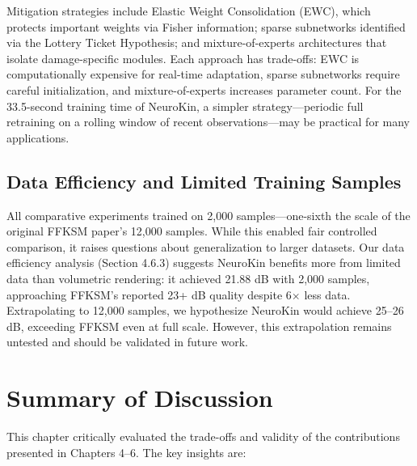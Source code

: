﻿\documentclass[12pt,a4paper,oneside]{report}
\begin{document}
Mitigation strategies include Elastic Weight Consolidation (EWC), which protects important weights via Fisher information; sparse subnetworks identified via the Lottery Ticket Hypothesis; and mixture-of-experts architectures that isolate damage-specific modules. Each approach has trade-offs: EWC is computationally expensive for real-time adaptation, sparse subnetworks require careful initialization, and mixture-of-experts increases parameter count. For the 33.5-second training time of NeuroKin, a simpler strategy---periodic full retraining on a rolling window of recent observations---may be practical for many applications.

\subsection{Data Efficiency and Limited Training Samples}

All comparative experiments trained on 2,000 samples---one-sixth the scale of the original FFKSM paper's 12,000 samples. While this enabled fair controlled comparison, it raises questions about generalization to larger datasets. Our data efficiency analysis (Section 4.6.3) suggests NeuroKin benefits more from limited data than volumetric rendering: it achieved 21.88 dB with 2,000 samples, approaching FFKSM's reported 23+ dB quality despite 6$\times$ less data. Extrapolating to 12,000 samples, we hypothesize NeuroKin would achieve 25--26 dB, exceeding FFKSM even at full scale. However, this extrapolation remains untested and should be validated in future work.

\section{Summary of Discussion}

This chapter critically evaluated the trade-offs and validity of the contributions presented in Chapters 4--6. The key insights are:
\end{document}
